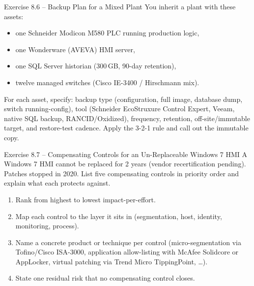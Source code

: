\documentclass[11pt,a4paper]{article}
\begin{document}
\begin{taskbox}{Exercise 8.6 -- Backup Plan for a Mixed Plant}
You inherit a plant with these assets:
\begin{itemize}\setlength{\itemsep}{0pt}
  \item one Schneider Modicon M580 PLC running production logic,
  \item one Wonderware (AVEVA) HMI server,
  \item one SQL Server historian (300\,GB, 90-day retention),
  \item twelve managed switches (Cisco IE-3400 / Hirschmann mix).
\end{itemize}
For each asset, specify: backup type (configuration, full image, database dump, switch running-config), tool (Schneider EcoStruxure Control Expert, Veeam, native SQL backup, RANCID/Oxidized), frequency, retention, off-site/immutable target, and restore-test cadence. Apply the 3-2-1 rule and call out the immutable copy.
\end{taskbox}

\begin{taskbox}{Exercise 8.7 -- Compensating Controls for an Un-Replaceable Windows 7 HMI}
A Windows 7 HMI cannot be replaced for 2 years (vendor recertification pending). Patches stopped in 2020. List five compensating controls in priority order and explain what each protects against.
\begin{enumerate}\setlength{\itemsep}{1pt}
  \item Rank from highest to lowest impact-per-effort.
  \item Map each control to the layer it sits in (segmentation, host, identity, monitoring, process).
  \item Name a concrete product or technique per control (micro-segmentation via Tofino/Cisco ISA-3000, application allow-listing with McAfee Solidcore or AppLocker, virtual patching via Trend Micro TippingPoint, \ldots).
  \item State one residual risk that no compensating control closes.
\end{enumerate}
\end{taskbox}
\end{document}
